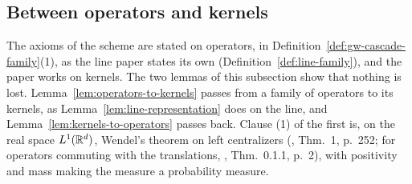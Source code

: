 \subsection{Between operators and kernels}

The axioms of the scheme are stated on operators, in Definition~\ref{def:gw-cascade-family}(1), as the
line paper states its own (Definition~\ref{def:line-family}), and the paper works on kernels. The two
lemmas of this subsection show that nothing is lost. Lemma~\ref{lem:operators-to-kernels} passes from a
family of operators to its kernels, as Lemma~\ref{lem:line-representation} does on the line, and
Lemma~\ref{lem:kernels-to-operators} passes back.
Clause (1) of the first is, on the real space $L^1(\mathbb{R}^d)$, Wendel's theorem on left centralizers
(, Thm.~1, p.~252; for operators commuting with the translations,
, Thm.~0.1.1, p.~2), with positivity and mass making the measure a
probability measure.

